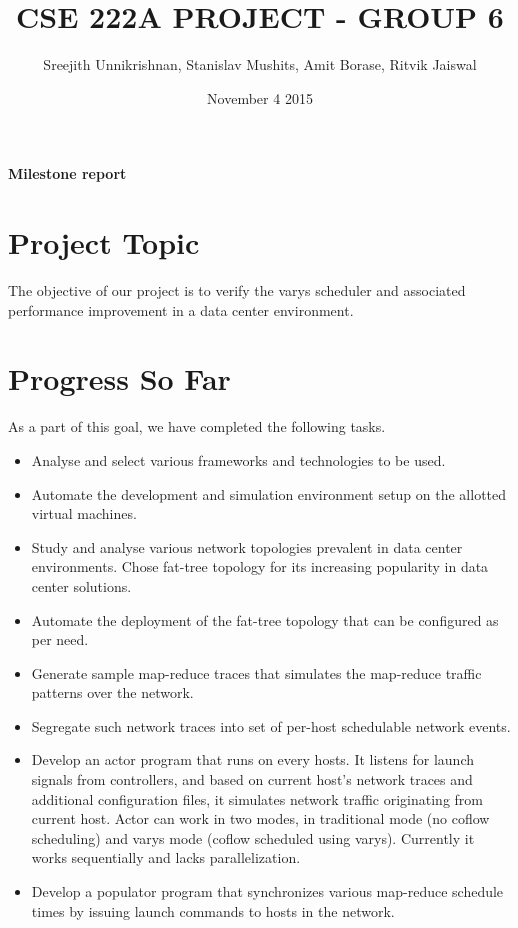 \documentclass{article}
\title{CSE 222A PROJECT - GROUP 6}
\author{Sreejith Unnikrishnan, Stanislav Mushits, Amit Borase, Ritvik Jaiswal }
\date{November 4 2015}
\begin{document}
\maketitle

\begin{center}
\textbf{Milestone report}
\end{center}


\section{Project Topic}
The objective of our project is to verify the varys scheduler\cite{varys} and associated performance improvement in a data center environment. 

\section{Progress So Far}
As a part of this goal, we have completed the following tasks.

\begin{itemize}
\item Analyse and select various frameworks and technologies to be used.
\item Automate the development and simulation environment setup on the allotted virtual machines.
\item Study and analyse various network topologies prevalent in data center environments. Chose fat-tree topology for its increasing popularity in data center solutions.
\item Automate the deployment of the fat-tree topology that can be configured as per need.
\item Generate sample map-reduce traces that simulates the map-reduce traffic patterns over the network.
\item Segregate such network traces into set of per-host schedulable network events.
\item  Develop an actor program that runs on every hosts. It listens for launch signals from controllers, and based on current host's network traces and additional configuration files, it simulates network traffic originating from current host. Actor can work in two modes, in traditional mode (no coflow scheduling) and varys mode (coflow scheduled using varys). Currently it works sequentially and lacks parallelization.
\item Develop a populator program that synchronizes various map-reduce schedule times by issuing launch commands to hosts in the network.

\end{itemize}
\end{document}
